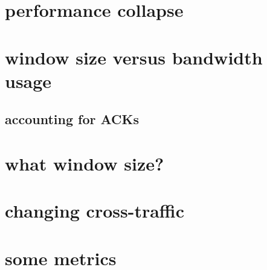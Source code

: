 \date{}
\title{}
\date{}

\begin{frame}
    \titlepage
\end{frame}

\section{performance collapse}


\section{window size versus bandwidth usage}

\subsection{accounting for ACKs}

\section{what window size?}



    




\section{changing cross-traffic}

\section{some metrics}

